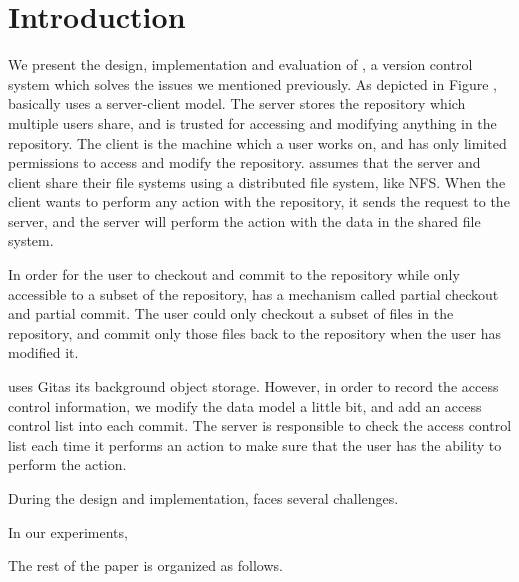 \section{Introduction}
\label{s:intro}

\newcommand{\git} {Git}
\newcommand{\nfs} {NFS}



We present the design, implementation and evaluation of \sys, a version control
system which solves the issues we mentioned previously. As depicted in Figure
, \sys basically
uses a server-client model. The server stores the repository which multiple
users share, and is trusted for accessing and modifying anything in the
repository. The client is the machine which a user works on, and has only
limited permissions to access and modify the repository. \sys assumes that the
server and client share their file systems using a distributed file system, like
\nfs. %
When the client wants to perform any action with the repository, it sends the
request to the server, and the server will perform the action with the data in
the shared file system. 

In order for the user to checkout and commit to the repository while only
accessible to a subset of the repository, \sys has a mechanism called partial
checkout and partial commit. The user could only checkout a subset of files in
the repository, and commit only those files back to the repository when the user
has modified it.

\sys uses \git as its background object storage. However, in order to record the
access control information, we modify the data model a little bit, and add an
access control list into each commit. The server is responsible to check the
access control list each time it performs an action to make sure that the user
has the ability to perform the action.

During the design and implementation, \sys faces several challenges. 

In our experiments, 


The rest of the paper is organized as follows. 

